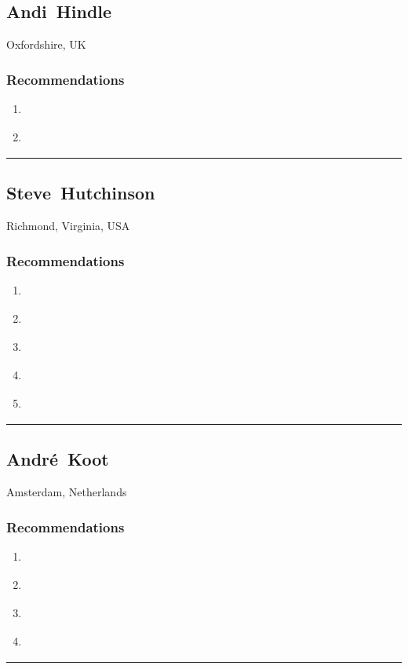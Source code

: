 \subsection{Andi~Hindle} \textsf{Oxfordshire, UK} \smallskip {} \sffamily  \medskip \subsubsection{Recommendations}\begin{enumerate}
\item \cite{Carlier2018}
\item \cite{Moore1991}
\end{enumerate}\noindent\rule{\textwidth}{0.2pt}

\subsection{Steve~Hutchinson} \textsf{Richmond, Virginia, USA} \smallskip {} \sffamily  \medskip \subsubsection{Recommendations}\begin{enumerate}
\item \cite{Birch2014}
\item \cite{Hardjono2016}
\item \cite{Nayyar2018}
\item \cite{Richer2017}
\item \cite{Schwartz2018}
\end{enumerate}\noindent\rule{\textwidth}{0.2pt}

\subsection{André~Koot} \textsf{Amsterdam, Netherlands} \smallskip {} \sffamily  \medskip \subsubsection{Recommendations}\begin{enumerate}
\item \cite{Cameron2005}
\item \cite{Hardt2005}
\item \cite{Harper2006}
\item \cite{Williamson2017}
\end{enumerate}\noindent\rule{\textwidth}{0.2pt}

